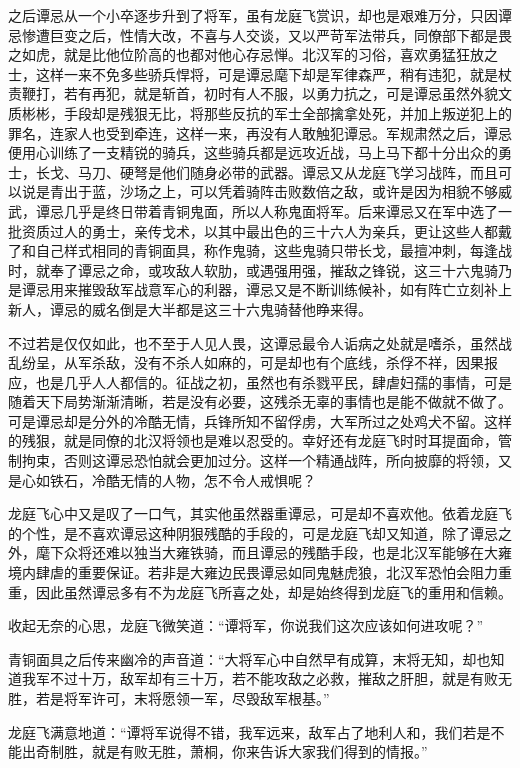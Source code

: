 之后谭忌从一个小卒逐步升到了将军，虽有龙庭飞赏识，却也是艰难万分，只因谭忌惨遭巨变之后，性情大改，不喜与人交谈，又以严苛军法带兵，同僚部下都是畏之如虎，就是比他位阶高的也都对他心存忌惮。北汉军的习俗，喜欢勇猛狂放之士，这样一来不免多些骄兵悍将，可是谭忌麾下却是军律森严，稍有违犯，就是杖责鞭打，若有再犯，就是斩首，初时有人不服，以勇力抗之，可是谭忌虽然外貌文质彬彬，手段却是残狠无比，将那些反抗的军士全部擒拿处死，并加上叛逆犯上的罪名，连家人也受到牵连，这样一来，再没有人敢触犯谭忌。军规肃然之后，谭忌便用心训练了一支精锐的骑兵，这些骑兵都是远攻近战，马上马下都十分出众的勇士，长戈、马刀、硬弩是他们随身必带的武器。谭忌又从龙庭飞学习战阵，而且可以说是青出于蓝，沙场之上，可以凭着骑阵击败数倍之敌，或许是因为相貌不够威武，谭忌几乎是终日带着青铜鬼面，所以人称鬼面将军。后来谭忌又在军中选了一批资质过人的勇士，亲传戈术，以其中最出色的三十六人为亲兵，更让这些人都戴了和自己样式相同的青铜面具，称作鬼骑，这些鬼骑只带长戈，最擅冲刺，每逢战时，就奉了谭忌之命，或攻敌人软肋，或遇强用强，摧敌之锋锐，这三十六鬼骑乃是谭忌用来摧毁敌军战意军心的利器，谭忌又是不断训练候补，如有阵亡立刻补上新人，谭忌的威名倒是大半都是这三十六鬼骑替他睁来得。

不过若是仅仅如此，也不至于人见人畏，这谭忌最令人诟病之处就是嗜杀，虽然战乱纷呈，从军杀敌，没有不杀人如麻的，可是却也有个底线，杀俘不祥，因果报应，也是几乎人人都信的。征战之初，虽然也有杀戮平民，肆虐妇孺的事情，可是随着天下局势渐渐清晰，若是没有必要，这残杀无辜的事情也是能不做就不做了。可是谭忌却是分外的冷酷无情，兵锋所知不留俘虏，大军所过之处鸡犬不留。这样的残狠，就是同僚的北汉将领也是难以忍受的。幸好还有龙庭飞时时耳提面命，管制拘束，否则这谭忌恐怕就会更加过分。这样一个精通战阵，所向披靡的将领，又是心如铁石，冷酷无情的人物，怎不令人戒惧呢？

龙庭飞心中又是叹了一口气，其实他虽然器重谭忌，可是却不喜欢他。依着龙庭飞的个性，是不喜欢谭忌这种阴狠残酷的手段的，可是龙庭飞却又知道，除了谭忌之外，麾下众将还难以独当大雍铁骑，而且谭忌的残酷手段，也是北汉军能够在大雍境内肆虐的重要保证。若非是大雍边民畏谭忌如同鬼魅虎狼，北汉军恐怕会阻力重重，因此虽然谭忌多有不为龙庭飞所喜之处，却是始终得到龙庭飞的重用和信赖。

收起无奈的心思，龙庭飞微笑道：“谭将军，你说我们这次应该如何进攻呢？”

青铜面具之后传来幽冷的声音道：“大将军心中自然早有成算，末将无知，却也知道我军不过十万，敌军却有三十万，若不能攻敌之必救，摧敌之肝胆，就是有败无胜，若是将军许可，末将愿领一军，尽毁敌军根基。”

龙庭飞满意地道：“谭将军说得不错，我军远来，敌军占了地利人和，我们若是不能出奇制胜，就是有败无胜，萧桐，你来告诉大家我们得到的情报。”

